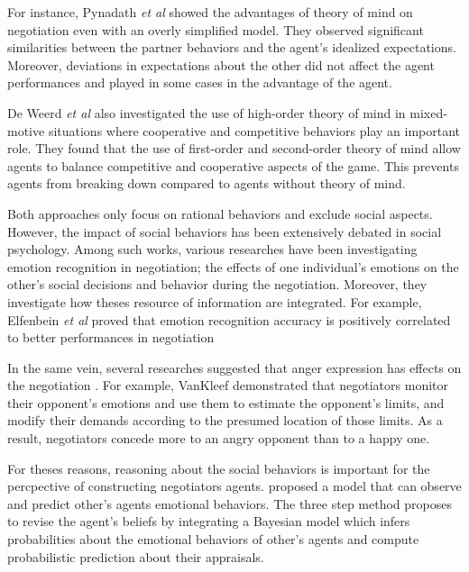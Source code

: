 \documentclass[conference, letterpaper]{IEEEtran}
\begin{document}
	For instance, Pynadath \textit{et al}\cite{pynadath2013you} showed the advantages of theory of mind on negotiation even with an overly simplified model. They observed significant similarities between	the partner behaviors and the agent's idealized expectations. Moreover, deviations in expectations about the other did not affect the agent performances and played in some cases in the advantage of the agent.
	
	De Weerd \textit{et al} \cite{de2013higher} also investigated the use of high-order theory of mind in mixed-motive situations where cooperative and competitive behaviors play an important role. They found that the use of first-order and second-order theory of mind allow agents to balance competitive and cooperative	aspects of the game. This prevents agents from breaking down compared to  agents without theory of mind.
	
	
	Both approaches only focus on rational behaviors and exclude social aspects. However, the impact of social behaviors has been extensively debated in social psychology. Among such works, various researches have been investigating emotion recognition in negotiation; the effects of one individual's	emotions on the other's social decisions and behavior during the negotiation. Moreover, they investigate how theses resource of information are integrated.
	For example, Elfenbein\textit{ et al} \cite{elfenbein2007reading} proved that  emotion recognition accuracy is positively correlated to  better performances in negotiation
	
	In the same vein, several researches suggested that anger expression has effects on the negotiation \cite{sinaceur2006get,van2010interpersonal,ferguson2004social}. For example, VanKleef \cite{van2004interpersonal} demonstrated that negotiators monitor their opponent's emotions and use them to estimate the opponent's limits, and modify their demands according to the presumed location of those limits. As a result, negotiators concede more to an angry opponent than to a happy one. 
	
	
	For theses reasons, reasoning about the social behaviors is important for the percpective of constructing negotiators agents. \cite{alfonso2015emotional} proposed a model that can observe and predict other's agents emotional behaviors. The three step method proposes to revise the agent's  beliefs by integrating a Bayesian model which infers probabilities about the emotional behaviors of other's agents and compute probabilistic prediction about their appraisals.
	
\end{document}
